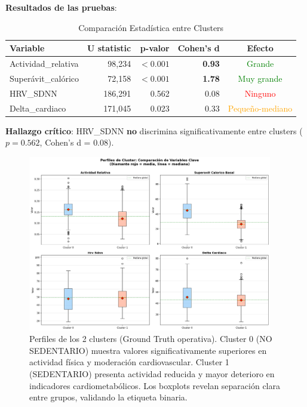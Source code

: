 \documentclass[12pt,letterpaper,twoside]{report}
\begin{document}
\begin{calculobox}
\textbf{Resultados de las pruebas}:

\begin{table}[H]
\centering
\caption{Comparación Estadística entre Clusters}
\label{tab:cluster_comparison}
\begin{tabular}{@{}lrrrc@{}}
\toprule
\textbf{Variable} & \textbf{U statistic} & \textbf{p-valor} & \textbf{Cohen's d} & \textbf{Efecto} \\
\midrule
Actividad\_relativa     & 98,234  & $< 0.001$ & \textbf{0.93} & \textcolor{green}{Grande} \\
Superávit\_calórico     & 72,158  & $< 0.001$ & \textbf{1.78} & \textcolor{green}{Muy grande} \\
HRV\_SDNN               & 186,291 & 0.562     & 0.08 & \textcolor{red}{Ninguno} \\
Delta\_cardiaco         & 171,045 & 0.023     & 0.33 & \textcolor{orange}{Pequeño-mediano} \\
\bottomrule
\end{tabular}
\end{table}

\textbf{Hallazgo crítico}: HRV\_SDNN \textbf{no} discrimina significativamente entre clusters ($p=0.562$, Cohen's d = 0.08).
\end{calculobox}

\begin{figure}[htbp]
\centering
\includegraphics[width=0.95\textwidth]{figuras/cluster_profiles_boxplots.png}
\caption{Perfiles de los 2 clusters (Ground Truth operativa). Cluster 0 (NO SEDENTARIO) muestra valores significativamente superiores en actividad física y moderación cardiovascular. Cluster 1 (SEDENTARIO) presenta actividad reducida y mayor deterioro en indicadores cardiometabólicos. Los boxplots revelan separación clara entre grupos, validando la etiqueta binaria.}
\label{fig:cluster_profiles}
\end{figure}
\end{document}
